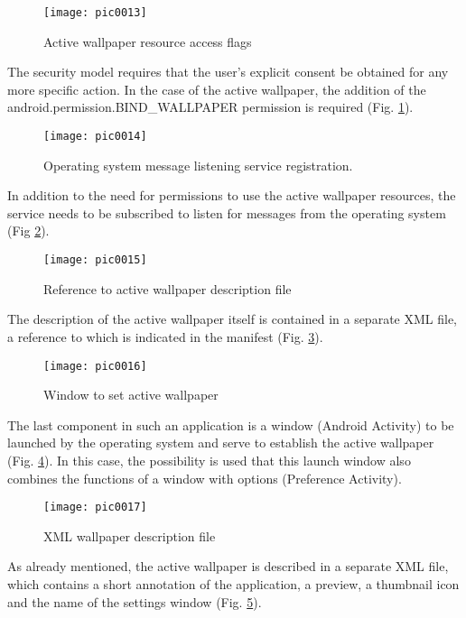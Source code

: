 \begin{figure}[h]
\centering
\texttt{[image: pic0013]}
\caption{Active wallpaper resource access flags}
\label{fig:pic0013}
\end{figure}
\FloatBarrier

The security model requires that the user's explicit consent be obtained for any more specific action. In the case of the active wallpaper, the addition of the android.permission.BIND\_WALLPAPER permission is required (Fig. \ref{fig:pic0013}).

\begin{figure}[h]
\centering
\texttt{[image: pic0014]}
\caption{Operating system message listening service registration.}
\label{fig:pic0014}
\end{figure}
\FloatBarrier

In addition to the need for permissions to use the active wallpaper resources, the service needs to be subscribed to listen for messages from the operating system (Fig \ref{fig:pic0014}).

\begin{figure}[h]
\centering
\texttt{[image: pic0015]}
\caption{Reference to active wallpaper description file}
\label{fig:pic0015}
\end{figure}
\FloatBarrier

The description of the active wallpaper itself is contained in a separate XML file, a reference to which is indicated in the manifest (Fig. \ref{fig:pic0015}).

\begin{figure}[h]
\centering
\texttt{[image: pic0016]}
\caption{Window to set active wallpaper}
\label{fig:pic0016}
\end{figure}
\FloatBarrier

The last component in such an application is a window (Android Activity) to be launched by the operating system and serve to establish the active wallpaper (Fig. \ref{fig:pic0016}). In this case, the possibility is used that this launch window also combines the functions of a window with options (Preference Activity).

\begin{figure}[h]
\centering
\texttt{[image: pic0017]}
\caption{XML wallpaper description file}
\label{fig:pic0017}
\end{figure}
\FloatBarrier

As already mentioned, the active wallpaper is described in a separate XML file, which contains a short annotation of the application, a preview, a thumbnail icon and the name of the settings window (Fig. \ref{fig:pic0017}).

